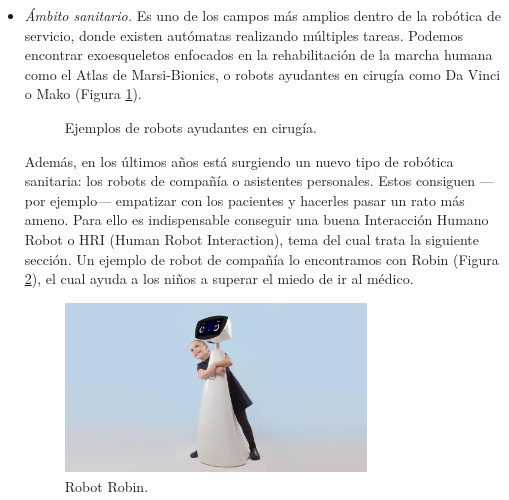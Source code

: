 \begin{itemize}
\item \textit{Ámbito sanitario.} Es uno de los campos más amplios dentro de la robótica de servicio, donde existen autómatas realizando múltiples tareas. Podemos encontrar exoesqueletos enfocados en la rehabilitación de la marcha humana como el Atlas de Marsi-Bionics, o robots ayudantes en cirugía como Da Vinci o Mako (Figura \ref{fig:robots_cirugia}).

\begin{figure}[h!]
  \begin{center}
    \subcapcentertrue
  \end{center}
\caption{Ejemplos de robots ayudantes en cirugía.}
\label{fig:robots_cirugia}
\end{figure}

Además, en los últimos años está surgiendo un nuevo tipo de robótica sanitaria: los robots de compañía o asistentes personales. Estos consiguen ---por ejemplo--- empatizar con los pacientes y hacerles pasar un rato más ameno. Para ello es indispensable conseguir una buena Interacción Humano Robot o HRI (Human Robot Interaction), tema del cual trata la siguiente sección. Un ejemplo de robot de compañía lo encontramos con Robin (Figura \ref{fig:robin}), el cual ayuda a los niños a superar el miedo de ir al médico.

\begin{figure} [h!]
  \begin{center}
    \includegraphics[width=8cm]{figs/robin.png}
  \end{center}
  \caption{Robot Robin.}
  \label{fig:robin}
\end{figure}
\end{itemize}

